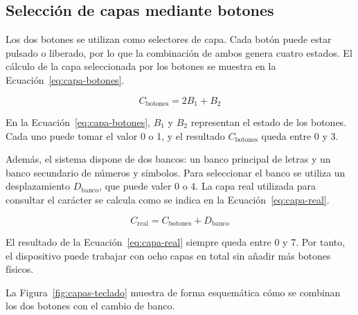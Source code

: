 \subsection{Selección de capas mediante botones}
\label{subsec:capas-botones-nuevo}

Los dos botones se utilizan como selectores de capa. Cada botón puede estar pulsado o liberado, por lo que la combinación de ambos genera cuatro estados. El cálculo de la capa seleccionada por los botones se muestra en la Ecuación~\ref{eq:capa-botones}.

\begin{equation}
    C_{\text{botones}} = 2B_1 + B_2
    \label{eq:capa-botones}
\end{equation}

En la Ecuación~\ref{eq:capa-botones}, \(B_1\) y \(B_2\) representan el estado de los botones. Cada uno puede tomar el valor 0 o 1, y el resultado \(C_{\text{botones}}\) queda entre 0 y 3.

Además, el sistema dispone de dos bancos: un banco principal de letras y un banco secundario de números y símbolos. Para seleccionar el banco se utiliza un desplazamiento \(D_{\text{banco}}\), que puede valer 0 o 4. La capa real utilizada para consultar el carácter se calcula como se indica en la Ecuación~\ref{eq:capa-real}.

\begin{equation}
    C_{\text{real}} = C_{\text{botones}} + D_{\text{banco}}
    \label{eq:capa-real}
\end{equation}

El resultado de la Ecuación~\ref{eq:capa-real} siempre queda entre 0 y 7. Por tanto, el dispositivo puede trabajar con ocho capas en total sin añadir más botones físicos.

La Figura~\ref{fig:capas-teclado} muestra de forma esquemática cómo se combinan los dos botones con el cambio de banco.

